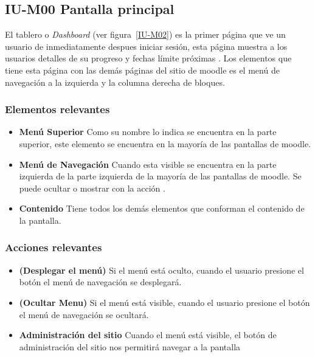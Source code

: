 
\subsection{IU-M00 Pantalla principal}

 El tablero o {\it Dashboard} (ver figura~\ref{IU-M02}) es la primer página que ve un usuario de
 inmediatamente despues iniciar sesión, esta página muestra a los usuarios detalles de su progreso
 y fechas límite próximas \cite{MoodleTablero} . Los elementos que tiene esta página con las demás
 páginas del sitio de moodle es el menú de navegación a la izquierda y la columna derecha de
 bloques.


\subsubsection{Elementos relevantes}

    \begin{itemize}
    \item
    {\bf Menú Superior}
        Como su nombre lo indica se encuentra en la parte superior, este elemento se
        encuentra en la mayoría de las pantallas de moodle.

    \item
    {\bf Menú de Navegación}
        Cuando esta visible se encuentra en la parte izquierda de la parte izquierda
        de la mayoría de las pantallas de moodle. Se puede ocultar o mostrar con la
        acción \IUMenu[].

    \item
    {\bf Contenido}
        Tiene todos los demás elementos que conforman el contenido de la pantalla.

    \end{itemize}

\subsubsection{Acciones relevantes}

    \begin{itemize}
    
    \item
    {\bf \IUMenu{} (Desplegar el menú)}
        Si el menú está oculto, cuando el usuario presione el botón \IUMenu{} el menú de
        navegación se desplegará.

    \item {\bf \IUMenu{} (Ocultar Menu)}
        Si el menú está visible, cuando el usuario presione el botón \IUMenu{} el menú de
        navegación se ocultará.

    \item {\bf \IUAdminSitio{} Administración del sitio }
        Cuando el menú está visible, el botón de administración del sitio nos permitirá
        navegar a la pantalla 

    \end{itemize}
